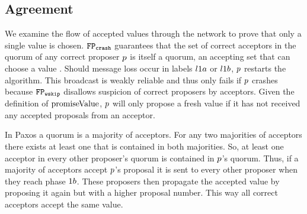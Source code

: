 \subsection{Agreement}
We examine the flow of accepted values through the network to prove that only a single value is chosen.
$\mathtt{FP_{crash}}$ guarantees that the set of correct acceptors in the quorum of any correct proposer $p$ is itself a quorum, \ie an accepting set that can choose a value \cite{Lamport06}.
Should message loss occur in labels $l1a$ or $l1b$, $p$ restarts the algorithm.
This broadcast is weakly reliable and thus only fails if $p$ crashes because $\mathtt{FP_{wskip}}$ disallows suspicion of correct proposers by acceptors.
Given the definition of $\operatorname{promiseValue}$, $p$ will only propose a fresh value if it has not received any accepted proposals from an acceptor.

In Paxos a quorum is a majority of acceptors.
For any two majorities of acceptors there exists at least one that is contained in both majorities.
So, at least one acceptor in every other proposer's quorum is contained in $p$'s quorum.
Thus, if a majority of acceptors accept $p$'s proposal it is sent to every other proposer when they reach phase $1b$.
These proposers then propagate the accepted value by proposing it again but with a higher proposal number.
This way all correct acceptors accept the same value.

